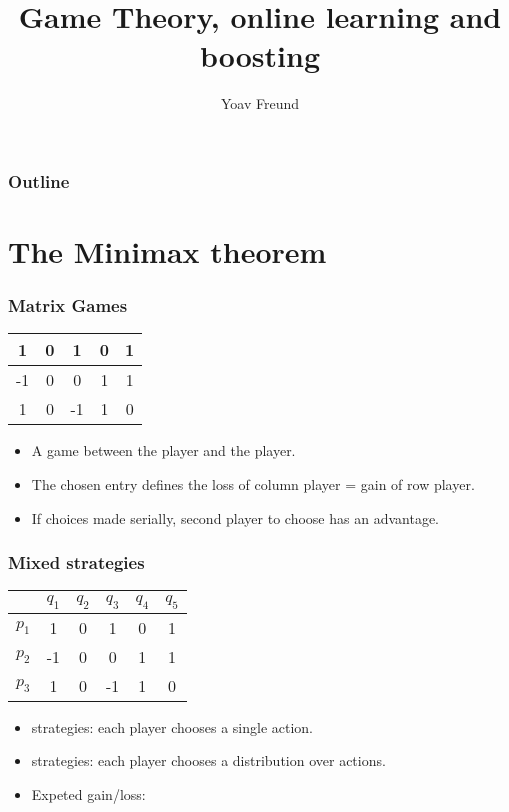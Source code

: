\documentclass[handout]{beamer}
\title[\ouralg] %
{Game Theory, online learning and boosting}
\author[Freund] %
{Yoav Freund}
\institute[Universities of Somewhere and Elsewhere] %
\begin{document}
\begin{frame}
  \titlepage
\end{frame}

\begin{frame}
  \frametitle{Outline}
  \tableofcontents[pausesections]
\end{frame}

\section{The Minimax theorem}

\begin{frame}
\frametitle{Matrix Games}
\begin{center}
\begin{tabular}{ |c|c|c|c|c| }
\hline
  1 & 0 & 1 &0 &1\\
\hline
  -1 & 0 & 0 &1 & 1\\
\hline
  1 & 0 & -1 & 1 & 0\\
\hline
\end{tabular}
\end{center}

\begin{itemize}
\item A game between the  player and the 
  player.
\item The chosen entry defines the loss of column player = gain of row player.
\item If choices made serially, second player to choose has an advantage.
\end{itemize}
\end{frame}

\begin{frame}
\frametitle{Mixed strategies}
\begin{center}
\begin{tabular}{l|c|c|c|c|c|}
  & $q_1$ & $q_2$ & $q_3$ & $q_4$ & $q_5$ \\
\hline
$p_1$ &  1 & 0 & 1 &0 &1\\
\hline
$p_2$ &  -1 & 0 & 0 &1 & 1\\
\hline
$p_3$ &  1 & 0 & -1 & 1 & 0\\
\hline
\end{tabular}
\end{center}

\begin{itemize}
\item {} strategies: each player chooses a single action.
\item {} strategies: each player chooses a distribution over actions.
\item Expeted gain/loss: 
\end{itemize}
\end{frame}
\end{document}
